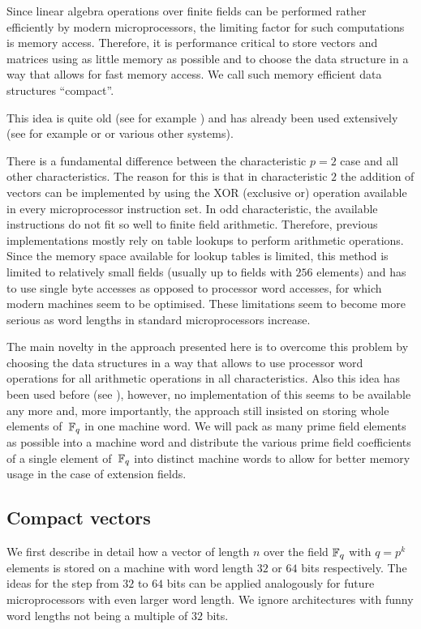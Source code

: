 Since linear algebra operations over finite fields can be performed
rather efficiently by modern microprocessors, the limiting factor 
for such computations is memory access. Therefore, it is performance
critical to store vectors and matrices using as little memory as possible
and to choose the data structure in a way that allows for fast memory
access. We call such memory efficient data structures ``compact''.

This idea is quite old (see for example \cite{MeatAxeRP}) and has already 
been used extensively (see for example \cite{CMeatAxe} or \cite{GAP4} or
various other systems).

There is a fundamental difference between the characteristic $p=2$ case
and all other characteristics. The reason for this is that in
characteristic $2$ the addition of vectors can be implemented by using
the XOR (exclusive or) operation available in every microprocessor
instruction set. In odd characteristic, the available instructions
do not fit so well to finite field arithmetic. Therefore, previous
implementations mostly rely on table lookups to perform arithmetic
operations. Since the memory space available for lookup tables is
limited, this method is limited to relatively small fields (usually up to
fields with $256$ elements) and has to use single byte accesses
as opposed to processor word accesses, for which modern machines
seem to be optimised. These limitations seem to become more serious
as word lengths in standard microprocessors increase.

The main novelty in the approach presented here is to overcome this
problem by choosing the data structures in a way that allows to use
processor word operations for all arithmetic operations in all
characteristics. Also this idea has been used before (see
\cite{EssenLinAlg}), however, no implementation of this seems to
be available any more and, more importantly, the approach still
insisted on storing whole elements of\, $\mathbb{F}_q$ in one machine word.
We will pack as many prime field elements as possible into a machine
word and distribute the various prime field coefficients of a single
element of\, $\mathbb{F}_q$ into distinct machine words to allow for better
memory usage in the case of extension fields.


\subsection{Compact vectors}
\label{ssec:cvec}

We first describe in detail how a vector of length $n$ over the field
$\mathbb{F}_q$ with $q=p^k$ elements is stored on a machine with word length $32$ 
or $64$ bits respectively. The ideas for the step from $32$ to $64$ bits
can be applied analogously for future microprocessors with even larger
word length. We ignore architectures with funny word lengths not being
a multiple of $32$ bits.

